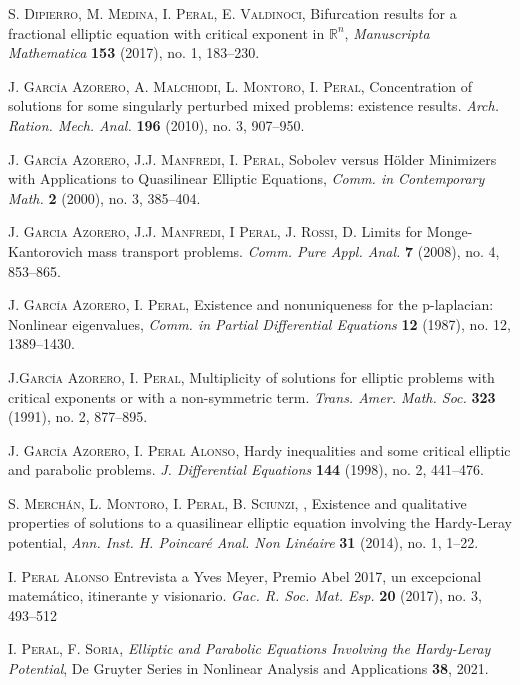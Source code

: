 \begin{thebibliography}{99}
    \textsc{S. Dipierro, M. Medina, I. Peral, E. Valdinoci}, Bifurcation results for a fractional elliptic equation with critical exponent in $\mathbb{R}^n$, \textit{Manuscripta Mathematica} \textbf{153} (2017), no. 1, 183--230.
 
    \textsc{J. Garc\'{i}a Azorero, A. Malchiodi,  L. Montoro, I.  Peral},  Concentration of solutions for some singularly perturbed
mixed problems: existence results. \textit{Arch. Ration. Mech. Anal.} \textbf{196} (2010), no. 3, 907--950.
 
    \textsc{J. Garc\'ia Azorero, J.J. Manfredi, I. Peral,} Sobolev versus H\"older Minimizers with Applications to Quasilinear Elliptic Equations, \textit{Comm. in Contemporary Math.} \textbf{2}  (2000), no. 3,  385--404.

    \textsc{J. Garcia Azorero, J.J. Manfredi, I Peral, J. Rossi},  D. Limits for Monge-Kantorovich mass transport problems. \textit{Comm. Pure Appl. Anal.} \textbf{7} (2008), no. 4, 853--865.

    \textsc{J. Garc\'ia Azorero, I. Peral,} Existence and nonuniqueness for the p-laplacian: Nonlinear eigenvalues, \textit{Comm. in Partial Differential Equations} \textbf{12}  (1987), no. 12,  1389--1430. 

   \textsc{J.Garc\'ia Azorero, I. Peral,} Multiplicity of solutions for elliptic problems with critical exponents or with a non-symmetric term. \textit{Trans. Amer. Math. Soc.} \textbf{323} (1991), no. 2, 877--895. 

   \textsc{J. Garc\'ia Azorero, I. Peral Alonso},  Hardy inequalities and some critical elliptic and parabolic problems. \textit{J. Differential Equations} \textbf{144} (1998), no. 2, 441--476.

   \textsc{S. Merch\'an, L. Montoro,  I. Peral, B. Sciunzi, }, {Existence and qualitative properties of solutions to  a quasilinear elliptic equation involving the Hardy-Leray potential}, \textit{Ann. Inst. H. Poincar\'e Anal. Non Lin\'eaire} \textbf{31} (2014), no. 1, 1--22.

   \textsc{I. Peral Alonso} Entrevista a Yves Meyer, Premio Abel 2017, un excepcional matem\'atico, itinerante y visionario. \textit{Gac. R. Soc. Mat. Esp.} \textbf{20} (2017), no. 3, 493--512
  
    \textsc{I. Peral, F. Soria}, \textit{Elliptic and Parabolic Equations Involving the Hardy-Leray Potential}, De Gruyter Series in Nonlinear Analysis and Applications \textbf{38}, 2021.
 

\end{thebibliography}
